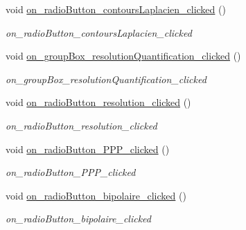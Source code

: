 \begin{DoxyCompactItemize}
\mbox{\label{classAppMainWindow_a5d0c70fd7f4d6ae9f59b75b235c6e059}} 
void \hyperlink{classAppMainWindow_a5d0c70fd7f4d6ae9f59b75b235c6e059}{on\+\_\+radio\+Button\+\_\+contours\+Laplacien\+\_\+clicked} ()
\begin{DoxyCompactList}\small\item\em on\+\_\+radio\+Button\+\_\+contours\+Laplacien\+\_\+clicked \end{DoxyCompactList}\item 
\mbox{\label{classAppMainWindow_a9f2d7bc14684fb1477a057e43ad433fb}} 
void \hyperlink{classAppMainWindow_a9f2d7bc14684fb1477a057e43ad433fb}{on\+\_\+group\+Box\+\_\+resolution\+Quantification\+\_\+clicked} ()
\begin{DoxyCompactList}\small\item\em on\+\_\+group\+Box\+\_\+resolution\+Quantification\+\_\+clicked \end{DoxyCompactList}\item 
\mbox{\label{classAppMainWindow_a3d15f22450268932f0a9b55eb7f22fc8}} 
void \hyperlink{classAppMainWindow_a3d15f22450268932f0a9b55eb7f22fc8}{on\+\_\+radio\+Button\+\_\+resolution\+\_\+clicked} ()
\begin{DoxyCompactList}\small\item\em on\+\_\+radio\+Button\+\_\+resolution\+\_\+clicked \end{DoxyCompactList}\item 
\mbox{\label{classAppMainWindow_acb52aa1b30dc79877f8fcff2df19c847}} 
void \hyperlink{classAppMainWindow_acb52aa1b30dc79877f8fcff2df19c847}{on\+\_\+radio\+Button\+\_\+\+P\+P\+P\+\_\+clicked} ()
\begin{DoxyCompactList}\small\item\em on\+\_\+radio\+Button\+\_\+\+P\+P\+P\+\_\+clicked \end{DoxyCompactList}\item 
\mbox{\label{classAppMainWindow_a86c706b829e1d8bc128c9ce376d80e34}} 
void \hyperlink{classAppMainWindow_a86c706b829e1d8bc128c9ce376d80e34}{on\+\_\+radio\+Button\+\_\+bipolaire\+\_\+clicked} ()
\begin{DoxyCompactList}\small\item\em on\+\_\+radio\+Button\+\_\+bipolaire\+\_\+clicked \end{DoxyCompactList}\item 

\end{DoxyCompactItemize}
